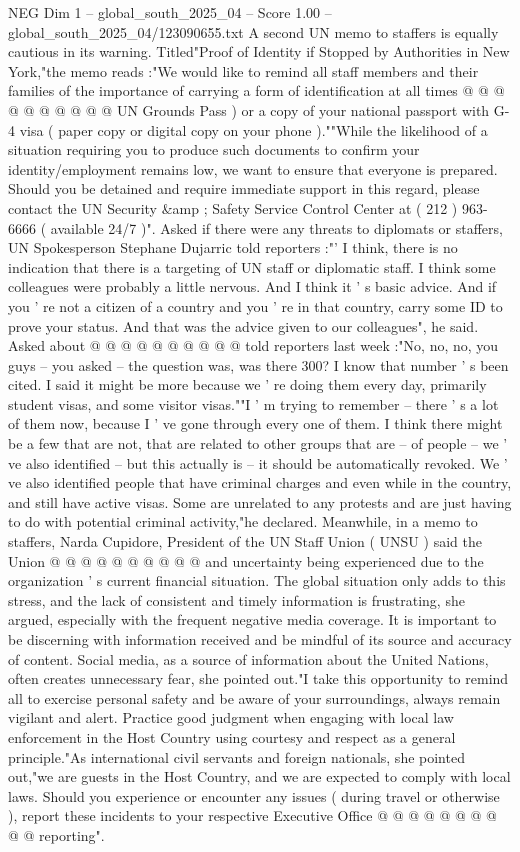 \begin{textsample}{NEG Dim 1 – global\_south\_2025\_04 – Score 1.00 – global\_south\_2025\_04/123090655.txt}
A second UN memo to staffers is equally cautious in its warning.
Titled"Proof of Identity if Stopped by Authorities in New York,"the memo reads :"We would like to remind all staff members and their families of the importance of carrying a form of identification at all times @ @ @ @ @ @ @ @ @ @ UN Grounds Pass ) or a copy of your national passport with G-4 visa ( paper copy or digital copy on your phone ).""While the likelihood of a situation requiring you to produce such documents to confirm your identity/employment remains low, we want to ensure that everyone is prepared.
Should you be detained and require immediate support in this regard, please contact the UN Security \&amp ; Safety Service Control Center at ( 212 ) 963-6666 ( available 24/7 )".
Asked if there were any threats to diplomats or staffers, UN Spokesperson Stephane Dujarric told reporters :"' I think, there is no indication that there is a targeting of UN staff or diplomatic staff.
I think some colleagues were probably a little nervous.
And I think it ' s basic advice.
And if you ' re not a citizen of a country and you ' re in that country, carry some ID to prove your status.
And that was the advice given to our colleagues", he said.
Asked about @ @ @ @ @ @ @ @ @ @ told reporters last week :"No, no, no, you guys -- you asked -- the question was, was there 300?
I know that number ' s been cited.
I said it might be more because we ' re doing them every day, primarily student visas, and some visitor visas.""I ' m trying to remember -- there ' s a lot of them now, because I ' ve gone through every one of them.
I think there might be a few that are not, that are related to other groups that are -- of people -- we ' ve also identified -- but this actually is -- it should be automatically revoked.
We ' ve also identified people that have criminal charges and even while in the country, and still have active visas.
Some are unrelated to any protests and are just having to do with potential criminal activity,"he declared.
Meanwhile, in a memo to staffers, Narda Cupidore, President of the UN Staff Union ( UNSU ) said the Union @ @ @ @ @ @ @ @ @ @ and uncertainty being experienced due to the organization ' s current financial situation.
The global situation only adds to this stress, and the lack of consistent and timely information is frustrating, she argued, especially with the frequent negative media coverage.
It is important to be discerning with information received and be mindful of its source and accuracy of content.
Social media, as a source of information about the United Nations, often creates unnecessary fear, she pointed out."I take this opportunity to remind all to exercise personal safety and be aware of your surroundings, always remain vigilant and alert.
Practice good judgment when engaging with local law enforcement in the Host Country using courtesy and respect as a general principle."As international civil servants and foreign nationals, she pointed out,"we are guests in the Host Country, and we are expected to comply with local laws.
Should you experience or encounter any issues ( during travel or otherwise ), report these incidents to your respective Executive Office @ @ @ @ @ @ @ @ @ @ reporting".


\end{textsample}

